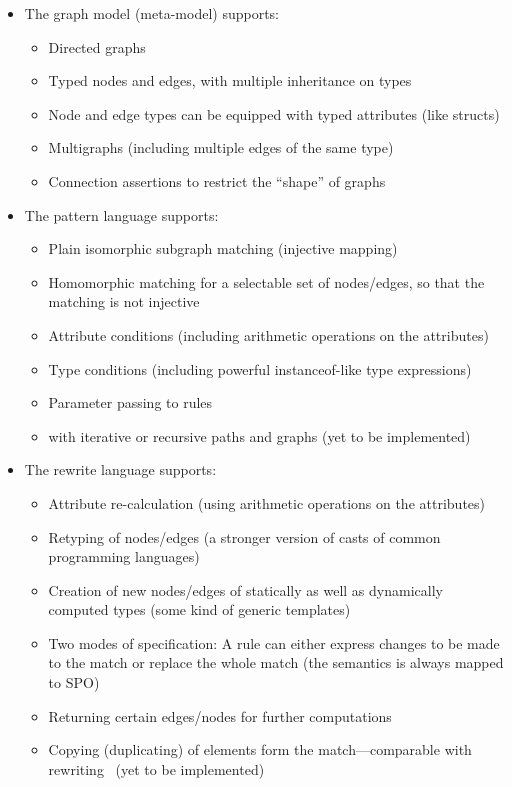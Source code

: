 \begin{itemize}
  \item The graph model (meta-model) supports:
  \begin{itemize}
    \item Directed graphs
    \item Typed nodes and edges, with multiple inheritance on types
    \item Node and edge types can be equipped with typed attributes (like structs)
    \item Multigraphs (including multiple edges of the same type)
    \item Connection assertions to restrict the ``shape'' of graphs
  \end{itemize}
  
  \item The pattern language supports:
  \begin{itemize}
    \item Plain isomorphic subgraph matching (injective mapping)
    \item Homomorphic matching for a selectable set of nodes/edges, so that the matching is not injective
    \item Attribute conditions (including arithmetic operations on the attributes)
    \item Type conditions (including powerful instanceof-like type expressions)
    \item Parameter passing to rules
    \item {} with iterative or recursive paths and graphs (yet to be implemented)
  \end{itemize}
  
  \item The rewrite language supports:
  \begin{itemize}
    \item Attribute re-calculation (using arithmetic operations on the attributes)
    \item Retyping of nodes/edges (a stronger version of casts of common programming languages)
    \item Creation of new nodes/edges of statically as well as dynamically computed types (some kind of generic templates)
    \item Two modes of specification: A rule can either express changes to be made to the match or replace the whole match (the semantics is always mapped to SPO)
    \item Returning certain edges/nodes for further computations
	  \item Copying (duplicating) of elements form the match---comparable with  rewriting~\cite{CHHK:06} (yet to be implemented)
  \end{itemize}
  

\end{itemize}
